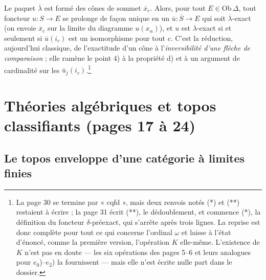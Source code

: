 \documentclass[11pt,a4paper]{article}
\begin{document}

Le paquet $\overline{\lambda}$ est formé des cônes de sommet $\overline
{x}_{c}$. Alors, pour tout $E \in \mathrm{Ob}\,\Delta$, tout foncteur $u :
S \to E$ se prolonge de façon unique en un $\overline{u} : \overline{S} \to
E$ qui soit $\overline{\lambda}$-exact (on envoie $\overline{x}_{c}$ sur la
limite du diagramme $u(x_{\alpha})$), et $u$ est $\lambda$-exact si et
seulement si $\overline{u}(i_{c})$ est un isomorphisme pour tout $c$. C'est
la réduction, aujourd'hui classique, de l'exactitude d'un cône à
l'\emph{inversibilité d'une flèche de comparaison} ; elle ramène le point 4)
à la propriété d) et à un argument de cardinalité sur les $\bar{u}_{j}
(i_{c})$.\footnote{La page 30 se termine par « cqfd », mais deux renvois
notés (*) et (**) restaient à écrire ; la page 31 écrit (**), le
dédoublement, et commence (*), la définition du foncteur $\delta$-préexact,
qui s'arrête après trois lignes. La reprise est donc complète pour tout ce
qui concerne l'ordinal $\omega$ et laisse à l'état d'énoncé, comme la
première version, l'opération $K$ elle-même. L'existence de $K$ n'est pas
en doute — les six opérations des pages 5--6 et leurs analogues pour
$e_{0}$)--$e_{2}$) la fournissent — mais elle n'est écrite nulle part dans
le dossier.}

\section*{Théories algébriques et topos classifiants (pages 17 à 24)}

\subsection*{Le topos enveloppe d'une catégorie à limites finies}
\end{document}
